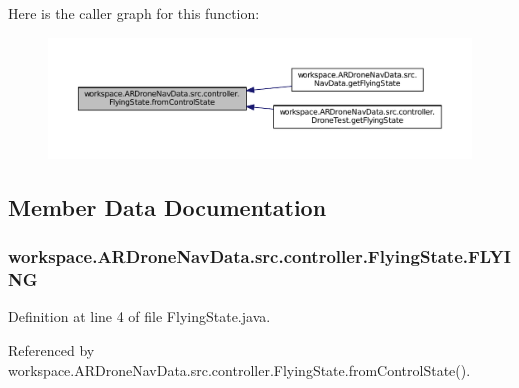 Here is the caller graph for this function\+:\nopagebreak
\begin{figure}[H]
\begin{center}
\leavevmode
\includegraphics[width=350pt]{enumworkspace_1_1_a_r_drone_nav_data_1_1src_1_1controller_1_1_flying_state_a7508078580e7a54beb62d89c26be4574_icgraph}
\end{center}
\end{figure}




\subsection{Member Data Documentation}
\hypertarget{enumworkspace_1_1_a_r_drone_nav_data_1_1src_1_1controller_1_1_flying_state_a632708e0a5fa83efb2d5099db7b8f385}{}
\subsubsection[{F\+L\+Y\+I\+N\+G}]{\setlength{\rightskip}{0pt plus 5cm}workspace.\+A\+R\+Drone\+Nav\+Data.\+src.\+controller.\+Flying\+State.\+F\+L\+Y\+I\+N\+G}\label{enumworkspace_1_1_a_r_drone_nav_data_1_1src_1_1controller_1_1_flying_state_a632708e0a5fa83efb2d5099db7b8f385}


Definition at line 4 of file Flying\+State.\+java.



Referenced by workspace.\+A\+R\+Drone\+Nav\+Data.\+src.\+controller.\+Flying\+State.\+from\+Control\+State().

\hypertarget{enumworkspace_1_1_a_r_drone_nav_data_1_1src_1_1controller_1_1_flying_state_ad17ba4a18698cd841657165c7252c2aa}{}
